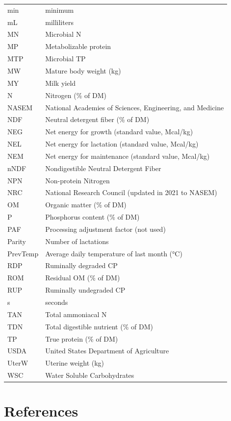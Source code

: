 \documentclass{article}
\begin{document}
\begin{refsection}
\begin{longtable}{@{} L{4cm} L{12cm} @{}}
min & minimum \\
mL & milliliters \\
MN & Microbial N \\
MP & Metabolizable protein \\
MTP & Microbial TP \\
MW & Mature body weight (kg) \\
MY & Milk yield \\
N & Nitrogen (\% of DM) \\
NASEM & National Academies of Sciences, Engineering, and Medicine \\
NDF & Neutral detergent fiber (\% of DM) \\
NEG & Net energy for growth (standard value, Mcal/kg) \\
NEL & Net energy for lactation (standard value, Mcal/kg) \\
NEM & Net energy for maintenance (standard value, Mcal/kg) \\
nNDF & Nondigestible Neutral Detergent Fiber \\
NPN & Non-protein Nitrogen \\
NRC & National Research Council (updated in 2021 to NASEM) \\
OM & Organic matter (\% of DM) \\
P & Phosphorus content (\% of DM) \\
PAF & Processing adjustment factor (not used) \\
Parity & Number of lactations \\
PrevTemp & Average daily temperature of last month (°C) \\
RDP & Ruminally degraded CP \\
ROM & Residual OM (\% of DM) \\
RUP & Ruminally undegraded CP \\
s & seconds \\
TAN & Total ammoniacal N \\
TDN & Total digestible nutrient (\% of DM) \\
TP & True protein (\% of DM) \\
USDA & United States Department of Agriculture \\
UterW & Uterine weight (kg) \\
WSC & Water Soluble Carbohydrates \\
\end{longtable}




\newpage

\label{sec:references-animal-module}
\section{References}
\printbibliography[heading=subbibliography,title={ }]
\end{refsection}
\end{document}
